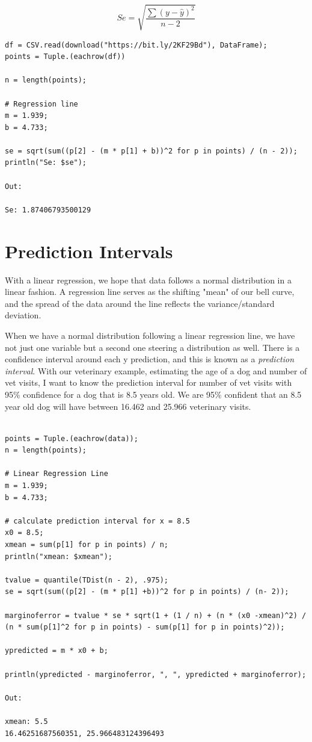 \documentclass[a4paper, 11pt]{article}
\begin{document}
$$
Se=\sqrt{\frac{\sum(y - \hat{y})^2}{n - 2}}
$$

\begin{lstlisting}[caption={Calculating the Standard Error of Estimate},label={lst:se}]
df = CSV.read(download("https://bit.ly/2KF29Bd"), DataFrame);
points = Tuple.(eachrow(df))

n = length(points);

# Regression line
m = 1.939;
b = 4.733;

se = sqrt(sum((p[2] - (m * p[1] + b))^2 for p in points) / (n - 2));
println("Se: $se");

Out:

Se: 1.87406793500129
\end{lstlisting}

\section{Prediction Intervals}

With a linear regression, we hope that data follows a normal distribution in a linear fashion. A regression line serves as the shifting "mean" of our bell curve, and the spread of the data around the line reflects the variance/standard deviation.

When we have a normal distribution following a linear regression line, we
have not just one variable but a second one steering a distribution as well.
There is a confidence interval around each y prediction, and this is known
as a \textit{prediction interval}. With our veterinary example, estimating the
age of a dog and number of vet visits, I want to know the prediction interval
for number of vet visits with 95\% confidence for a dog that is 8.5 years old. We are 95\% confident that an 8.5 year old dog will have between 16.462 and 25.966 veterinary visits.

\begin{lstlisting}[caption={Calculating a prediction interval of vet visits for a dog that's 8.5 years old},label={lst:predint}]

points = Tuple.(eachrow(data));
n = length(points);

# Linear Regression Line
m = 1.939;
b = 4.733;

# calculate prediction interval for x = 8.5
x0 = 8.5;
xmean = sum(p[1] for p in points) / n;
println("xmean: $xmean");

tvalue = quantile(TDist(n - 2), .975);
se = sqrt(sum((p[2] - (m * p[1] +b))^2 for p in points) / (n- 2));

marginoferror = tvalue * se * sqrt(1 + (1 / n) + (n * (x0 -xmean)^2) / (n * sum(p[1]^2 for p in points) - sum(p[1] for p in points)^2));

ypredicted = m * x0 + b;
	
println(ypredicted - marginoferror, ", ", ypredicted + marginoferror);

Out:

xmean: 5.5
16.46251687560351, 25.966483124396493

\end{lstlisting}
\end{document}
